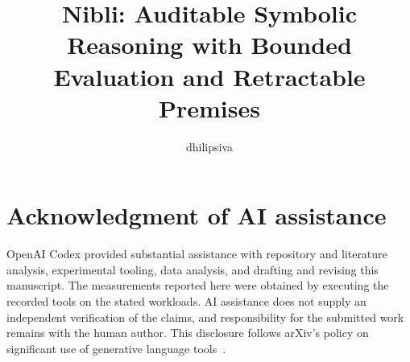 \documentclass[10pt,letterpaper]{article}
\title{Nibli: Auditable Symbolic Reasoning with Bounded Evaluation and Retractable Premises}
\author{dhilipsiva}
\date{}
\begin{document}
\maketitle
\begin{abstract}

\end{abstract}








\label{main-end}
\clearpage
\section*{Acknowledgment of AI assistance}
OpenAI Codex provided substantial assistance with repository and literature
analysis, experimental tooling, data analysis, and drafting and revising this
manuscript. The measurements reported here were obtained by executing the
recorded tools on the stated workloads. AI assistance does not supply an
independent verification of the claims, and responsibility for the submitted
work remains with the human author. This disclosure follows arXiv's policy
on significant use of generative language tools~\cite{arxiv-policy}.


\clearpage
\appendix

\end{document}
